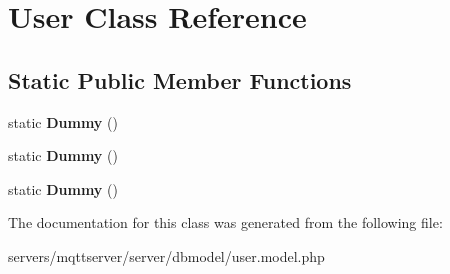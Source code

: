 \hypertarget{class_lora_1_1_user}{}\section{User Class Reference}
\label{class_lora_1_1_user}
\subsection*{Static Public Member Functions}
\begin{DoxyCompactItemize}
\item 
\mbox{\label{class_lora_1_1_user_a5fa82974fde7d3972f903d82e511ee8e}} 
static {\bfseries Dummy} ()
\item 
\mbox{\label{class_lora_1_1_user_a5fa82974fde7d3972f903d82e511ee8e}} 
static {\bfseries Dummy} ()
\item 
\mbox{\label{class_lora_1_1_user_a5fa82974fde7d3972f903d82e511ee8e}} 
static {\bfseries Dummy} ()
\end{DoxyCompactItemize}


The documentation for this class was generated from the following file\+:\begin{DoxyCompactItemize}
\item 
servers/mqttserver/server/dbmodel/user.\+model.\+php\end{DoxyCompactItemize}
